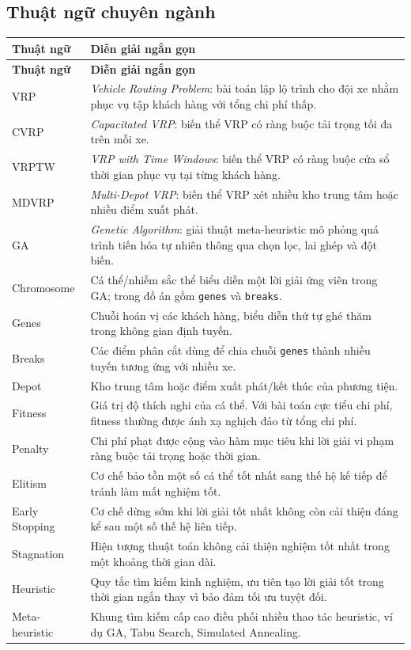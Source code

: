 \documentclass[12pt,a4paper]{article}
\numberwithin{figure}{subsection}
\numberwithin{table}{subsection}
\begin{document}
\subsection*{Thuật ngữ chuyên ngành}
\renewcommand{\arraystretch}{1.22}
\begin{longtable}{|p{3.2cm}|p{10.8cm}|}
\hline
\textbf{Thuật ngữ} & \textbf{Diễn giải ngắn gọn} \\
\hline
\endfirsthead
\hline
\textbf{Thuật ngữ} & \textbf{Diễn giải ngắn gọn} \\
\hline
\endhead
VRP & \textit{Vehicle Routing Problem}: bài toán lập lộ trình cho đội xe nhằm phục vụ tập khách hàng với tổng chi phí thấp. \\
\hline
CVRP & \textit{Capacitated VRP}: biến thể VRP có ràng buộc tải trọng tối đa trên mỗi xe. \\
\hline
VRPTW & \textit{VRP with Time Windows}: biến thể VRP có ràng buộc cửa sổ thời gian phục vụ tại từng khách hàng. \\
\hline
MDVRP & \textit{Multi-Depot VRP}: biến thể VRP xét nhiều kho trung tâm hoặc nhiều điểm xuất phát. \\
\hline
GA & \textit{Genetic Algorithm}: giải thuật meta-heuristic mô phỏng quá trình tiến hóa tự nhiên thông qua chọn lọc, lai ghép và đột biến. \\
\hline
Chromosome & Cá thể/nhiễm sắc thể biểu diễn một lời giải ứng viên trong GA; trong đồ án gồm \texttt{genes} và \texttt{breaks}. \\
\hline
Genes & Chuỗi hoán vị các khách hàng, biểu diễn thứ tự ghé thăm trong không gian định tuyến. \\
\hline
Breaks & Các điểm phân cắt dùng để chia chuỗi \texttt{genes} thành nhiều tuyến tương ứng với nhiều xe. \\
\hline
Depot & Kho trung tâm hoặc điểm xuất phát/kết thúc của phương tiện. \\
\hline
Fitness & Giá trị độ thích nghi của cá thể. Với bài toán cực tiểu chi phí, fitness thường được ánh xạ nghịch đảo từ tổng chi phí. \\
\hline
Penalty & Chi phí phạt được cộng vào hàm mục tiêu khi lời giải vi phạm ràng buộc tải trọng hoặc thời gian. \\
\hline
Elitism & Cơ chế bảo tồn một số cá thể tốt nhất sang thế hệ kế tiếp để tránh làm mất nghiệm tốt. \\
\hline
Early Stopping & Cơ chế dừng sớm khi lời giải tốt nhất không còn cải thiện đáng kể sau một số thế hệ liên tiếp. \\
\hline
Stagnation & Hiện tượng thuật toán không cải thiện nghiệm tốt nhất trong một khoảng thời gian dài. \\
\hline
Heuristic & Quy tắc tìm kiếm kinh nghiệm, ưu tiên tạo lời giải tốt trong thời gian ngắn thay vì bảo đảm tối ưu tuyệt đối. \\
\hline
Meta-heuristic & Khung tìm kiếm cấp cao điều phối nhiều thao tác heuristic, ví dụ GA, Tabu Search, Simulated Annealing. \\
\hline
\end{longtable}
\end{document}
